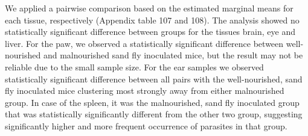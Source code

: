 \documentclass[
  12pt,
  letterpaper,
]{article}
\begin{document}
We applied a pairwise comparison based on the estimated marginal means for each tissue, respectively (Appendix table 107 and 108). The analysis showed no statistically significant difference between groups for the tissues brain, eye and liver. For the paw, we observed a statistically significant difference between well-nourished and malnourished sand fly inoculated mice, but the result may not be reliable due to the small sample size. For the ear samples we observed statistically significant difference between all pairs with the well-nourished, sand fly inoculated mice clustering most strongly away from either malnourished group. In case of the spleen, it was the malnourished, sand fly inoculated group that was statistically significantly different from the other two group, suggesting significantly higher and more frequent occurrence of parasites in that group.
\end{document}
